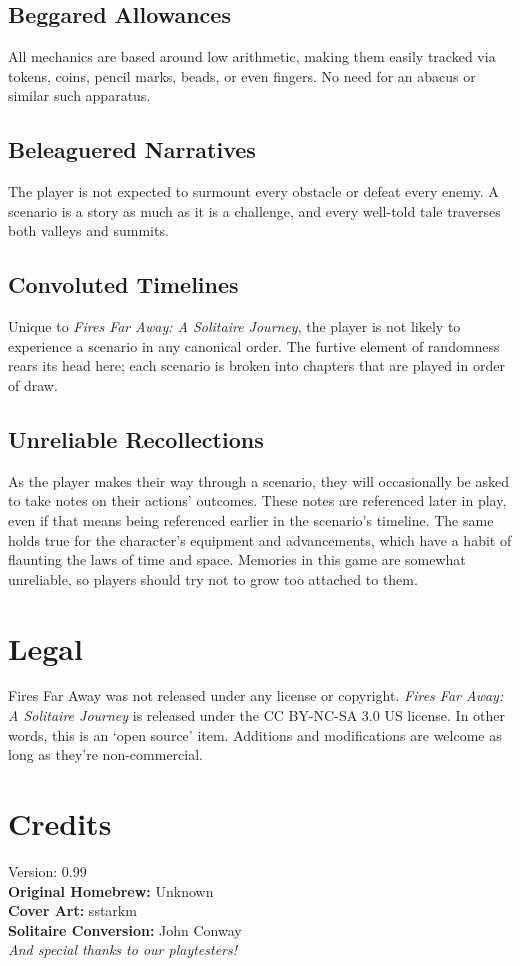 \documentclass[12pt]{article}
\begin{document}
\begin{multicols*}{2}
\subsection*{Beggared Allowances}
All mechanics are based around low arithmetic, making them easily tracked via tokens, coins, pencil marks, beads, or even fingers. No need for an abacus or similar such apparatus.

\subsection*{Beleaguered Narratives}
The player is not expected to surmount every obstacle or defeat every enemy. A scenario is a story as much as it is a challenge, and every well-told tale traverses both valleys and summits.

\subsection*{Convoluted Timelines}
Unique to \emph{Fires Far Away: A Solitaire Journey}, the player is not likely to experience a scenario in any canonical order. The furtive element of randomness rears its head here; each scenario is broken into chapters that are played in order of draw.

\subsection*{Unreliable Recollections}
As the player makes their way through a scenario, they will occasionally be asked to take notes on their actions’ outcomes. These notes are referenced later in play, even if that means being referenced earlier in the scenario’s timeline. The same holds true for the character’s equipment and advancements, which have a habit of flaunting the laws of time and space. Memories in this game are somewhat unreliable, so players should try not to grow too attached to them.

\vfill

\section*{Legal}
Fires Far Away was not released under any license or copyright. \emph{Fires Far Away: A Solitaire Journey} is released under the CC BY-NC-SA 3.0 US license. In other words, this is an ‘open source’ item. Additions and modifications are welcome as long as they’re non-commercial.

\section*{Credits}
Version: 0.99\\
\textbf{Original Homebrew:} Unknown\\
\textbf{Cover Art:} sstarkm\\
\textbf{Solitaire Conversion:} John Conway\\
\emph{And special thanks to our playtesters!}


\end{multicols*}
\end{document}
